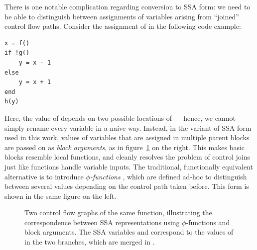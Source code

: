 There is one notable complication regarding conversion to SSA form: we need to be able to
distinguish between assignments of variables arising from \enquote{joined} control flow paths.
Consider the assignment of  in the following code example:
\begin{lstlisting}
x = f()
if !g()
    y = x - 1
else
    y = x + 1
end
h(y)
\end{lstlisting}
Here, the value of  depends on two possible locations of ~-- hence, we cannot
simply rename every variable in a naive way.  Instead, in the variant of SSA form used in this work,
values of variables that are assigned in multiple parent blocks are passed on as \emph{block
  arguments}, as in figure~\ref{fig:ssa-phi} on the right.  This makes basic blocks resemble local
functions, and cleanly resolves the problem of control joins just like functions handle variable
inputs.  The traditional, functionally equivalent alternative is to introduce
\emph{\(\phi\)-functions} \parencite{rosen1988global}, which are defined ad-hoc to distinguish
between several values depending on the control path taken before.  This form is shown in the same
figure on the left.

\begin{figure}[t]
  \centering
  \hfill
  \hfill
  \hfill\null
  \caption{Two control flow graphs of the same function, illustrating the correspondence between SSA
    representations using \(\phi\)-functions and block arguments.  The SSA variables
    \protect{} and \protect{} correspond to the values of \protect{} in the
    two branches, which are merged in \protect{}.}
  \label{fig:ssa-phi}
\end{figure}

